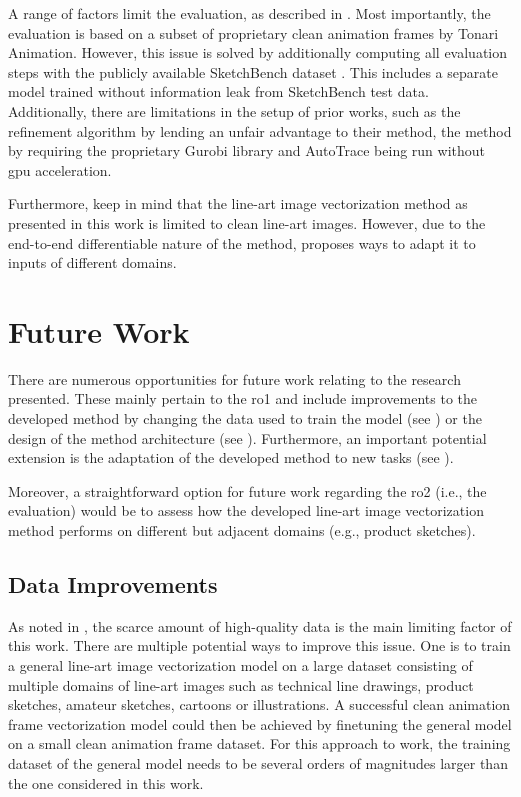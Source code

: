 A range of factors limit the evaluation, as described in . Most importantly, the evaluation is based on a subset of proprietary clean animation frames by Tonari Animation. However, this issue is solved by additionally computing all evaluation steps with the publicly available SketchBench dataset \citep{Yan:2020:ABR}. This includes a separate model trained without information leak from SketchBench test data. Additionally, there are limitations in the setup of prior works, such as the refinement algorithm by \citet{DBLP:conf/eccv/EgiazarianVAVST20} lending an unfair advantage to their method, the method by \citet{Puhachov2021KeypointPolyvector} requiring the proprietary Gurobi library \citep{gurobi} and AutoTrace \citep{autotrace} being run without \gls{gpu} acceleration.

Furthermore, keep in mind that the line-art image vectorization method as presented in this work is limited to clean line-art images. However, due to the end-to-end differentiable nature of the method,  proposes ways to adapt it to inputs of different domains. 

\section{Future Work}
\label{sec:future.work}

There are numerous opportunities for future work relating to the research presented. These mainly pertain to the \gls{ro1} and include improvements to the developed method by changing the data used to train the model (see ) or the design of the method architecture (see ). Furthermore, an important potential extension is the adaptation of the developed method to new tasks (see ).

Moreover, a straightforward option for future work regarding the \gls{ro2} (i.e., the evaluation) would be to assess how the developed line-art image vectorization method performs on different but adjacent domains (e.g., product sketches).

\subsection{Data Improvements}
\label{subsec:future.method.data}
As noted in , the scarce amount of high-quality data is the main limiting factor of this work. There are multiple potential ways to improve this issue. One is to train a general line-art image vectorization model on a large dataset consisting of multiple domains of line-art images such as technical line drawings, product sketches, amateur sketches, cartoons or illustrations. A successful clean animation frame vectorization model could then be achieved by finetuning the general model on a small clean animation frame dataset. For this approach to work, the training dataset of the general model needs to be several orders of magnitudes larger than the one considered in this work.


